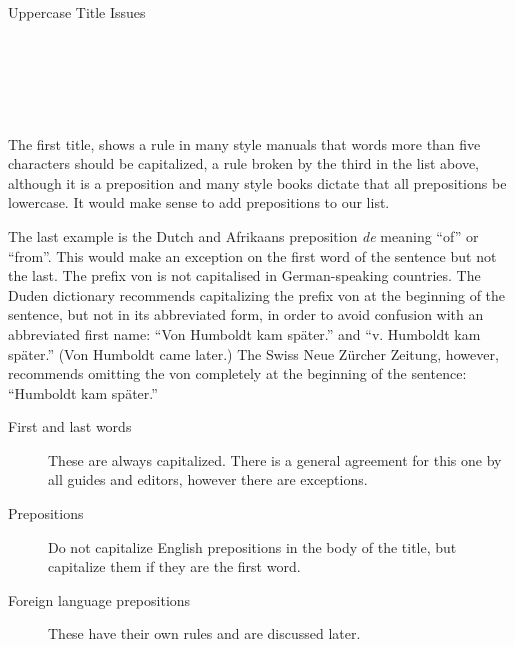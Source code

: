 \begin{texexample}{Uppercase Title Issues}{}
\\
\\
\\
\\
\\
\\
\end{texexample}


The first title, shows a rule in many style manuals that words more than five characters should be capitalized, a rule broken by the third in the list above, although it is a preposition and many style books dictate that all prepositions be lowercase. It would make sense to add prepositions to our list. 

The last example is the Dutch and Afrikaans preposition \emph{de} meaning  \enquote{of} or \enquote{from}. This would make an exception on the first word of the sentence but not the last. The prefix von is not capitalised in German-speaking countries. The Duden dictionary recommends capitalizing the prefix von at the beginning of the sentence, but not in its abbreviated form, in order to avoid confusion with an abbreviated first name: \enquote{Von Humboldt kam später.} and \enquote{v. Humboldt kam später.} (Von Humboldt came later.) The Swiss Neue Zürcher Zeitung, however, recommends omitting the von completely at the beginning of the sentence: \enquote{Humboldt kam später.}


\begin{description}
\item [First and last words] These are always capitalized. There is a general agreement for this one by all guides and editors, however there are exceptions.

\item [Prepositions] Do not capitalize English prepositions in the body of the title, but capitalize them if they are the first word.

\item [Foreign language prepositions] These have their own rules and are discussed later.
\end{description}


